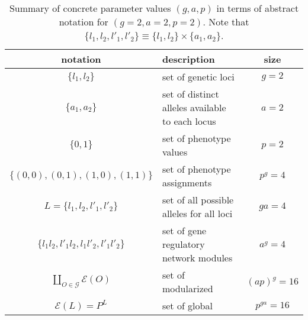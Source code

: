 \begin{table}[!ht]
\centering
\begin{tabular}{ c | l | c }
	\textbf{notation} & \textbf{description} & \textbf{size}\\ \hline \hline
	$\{l_1,l_2\}$ & set of genetic loci & $g = 2$\\ \hline
	$\{a_1,a_2\}$ & set of distinct alleles available to each locus & $a = 2$\\ \hline
	$\{0,1\}$ & set of phenotype values & $p = 2$\\ \hline
	$\{(0,0),(0,1),(1,0),(1,1)\}$ & set of phenotype assignments & $p^g = 4$\\ \hline
	$L = \{l_1,l_2,l'_1,l'_2\}$ & set of all possible alleles for all loci & $ga = 4$\\ \hline
	$\{l_1 l_2,l'_1 l_2,l_1 l'_2,l'_1 l'_2\}$ & set of gene regulatory network modules & $a^g = 4$\\ \hline
$\coprod_{O \in \mathcal{G}} \mathcal{E}(O)$ & set of modularized \gnpm{}  & $(ap)^g = 16$\\ \hline
	$\mathcal{E}(L) = P^L$ & set of global \gnpm{} & $p^{ga} = 16$\\
    \end{tabular}
\caption{Summary of concrete parameter values $(g,a,p)$ in terms of abstract notation for $(g=2,a=2,p=2)$. Note that $\{l_1,l_2,l'_1,l'_2\} \equiv \{l_1,l_2\} \times \{a_1,a_2\}$.}
\label{tab:pars222}
\end{table}
